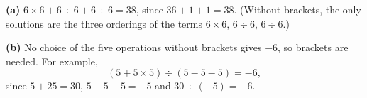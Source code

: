 \textbf{(a)} $\boxed{6\times6+6\div6+6\div6=38}$, since $36+1+1=38$. (Without brackets, the only solutions are the three orderings of the terms $6\times6$, $6\div6$, $6\div6$.)

\textbf{(b)} No choice of the five operations without brackets gives $-6$, so brackets are needed. For example,
\[\boxed{(5+5\times5)\div(5-5-5)=-6},\]
since $5+25=30$, $5-5-5=-5$ and $30\div(-5)=-6$.
